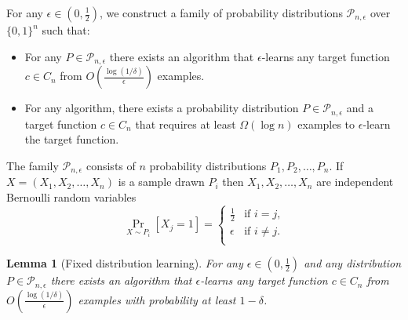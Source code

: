 \documentclass[12pt]{article}
\newtheorem{lemma}[proposition]{Lemma}
\renewcommand{\P}{\mathcal{P}}
\begin{document}
For any $\epsilon \in (0,\frac{1}{2})$,
we construct a family of probability distributions $\P_{n,\epsilon}$ over $\{0,1\}^n$ such that:
\begin{itemize}
\item For any $P \in \P_{n,\epsilon}$ there exists an algorithm that $\epsilon$-learns
any target function $c \in C_n$ from $O \left( \frac{\log(1/\delta)}{\epsilon} \right)$ examples.
\item For any algorithm, there exists
a probability distribution $P \in \P_{n,\epsilon}$ and a target function $c \in C_n$
that requires at least $\Omega(\log n)$ examples to $\epsilon$-learn the target function.
\end{itemize}

The family $\P_{n,\epsilon}$ consists of $n$ probability distributions $P_1, P_2, \dots, P_n$.
If $X = (X_1, X_2, \dots, X_n)$ is a sample drawn $P_i$ then $X_1, X_2, \dots, X_n$
are independent Bernoulli random variables
$$
\Pr_{X \sim P_i}[X_j = 1] =
\begin{cases}
\frac{1}{2} & \text{if $i = j$,} \\
\epsilon & \text{if $i \neq j$.} \\
\end{cases}
$$

\begin{lemma}[Fixed distribution learning]
For any $\epsilon \in (0,\frac{1}{2})$ and any distribution $P \in
\P_{n,\epsilon}$ there exists an algorithm that $\epsilon$-learns any target
function $c \in C_n$ from $O \left( \frac{\log(1/\delta)}{\epsilon} \right)$
examples with probability at least $1 - \delta$.
\end{lemma}
\end{document}
